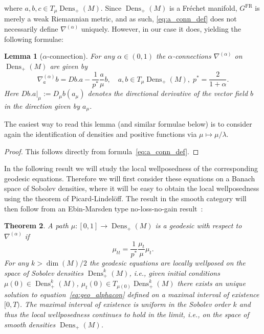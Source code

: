 \documentclass[11pt]{amsart}
\newtheorem{theorem}{Theorem}[section]
\newtheorem{lemma}[theorem]{Lemma}
\theoremstyle{definition}
\newcommand{\dx}{\lambda}
\newcommand{\Prob}{\operatorname{Prob}(M)}
\newcommand{\Dens}{\operatorname{Dens}_+(M)}
\newcommand{\Densk}{\operatorname{Dens}^k_+(M)}
\newcommand{\GFR}{G^{\mathrm{FR}}}
\newcommand{\nablabar}{\overline{\nabla}}
\begin{document}
where $a,b,c\in T_\mu\Dens$.
Since $\Dens$ is a Fr\'echet manifold, $\GFR$ is merely a weak Riemannian metric, and as such, \eqref{eq:a_conn_def} does not necessarily define $\nabla^{(\alpha)}$ uniquely.
However, in our case it does, yielding the following formulae:
\begin{lemma}[$\alpha$-connection]\label{lem:alphacon}
    For any $\alpha\in (0,1)$ the $\alpha$-connections $\nabla^{(\alpha)}$ on $\Dens$ are given by
    \begin{equation}\label{alpha-dens}
    \nabla^{(\alpha)}_a b = Db.a - \frac{1}{p^*} \frac{a}{\mu}b,\quad a,b\in T_\mu\Dens,\;p^* = \frac{2}{1+\alpha}.
    \end{equation}
    Here $Db.a|_{\mu}:=D_\mu b(a_\mu)$ denotes the directional derivative of the vector field $b$ in the direction given by $a_\mu$. 
\end{lemma}
The easiest way to read this lemma (and similar formulae below) is to consider again the identification of densities and positive functions via $\mu\mapsto \mu/\dx$.
\begin{proof}
This follows directly from formula~\eqref{eq:a_conn_def}.
\end{proof}
In the following result we will study the local wellposedness of the corresponding geodesic equations. Therefore we will first consider these equations on a Banach space of Sobolev densities, where it will be easy to obtain the local wellposedness using the theorem of Picard-Lindel\"off. The result in the smooth category will then follow from an Ebin-Marsden type no-loss-no-gain result~\cite{ebin1970groups}:
\begin{theorem}\label{thm:geo_alpha_dens}
A path $\mu:[0,1]\to \Dens$ is a geodesic with respect to $\nabla^{(\alpha)}$ if
\begin{equation}\label{eq:geo_alphacon}
\mu_{tt} = \frac{1}{p^*}\frac{\mu_t}{\mu}\mu_t.
\end{equation}
For any $k>\operatorname{dim}(M)/2$ the geodesic equations are locally wellposed on the space of Sobolev densities $\Densk$, i.e., given initial conditions $\mu(0)\in \Densk$, $\mu_t(0)\in T_{\mu(0)}\Densk$ there exists an unique solution to equation~\eqref{eq:geo_alphacon} defined on a maximal interval of existence $[0,T)$. 
The maximal interval of existence is uniform in the Sobolev order $k$ and thus the local wellposedness continues to hold in the limit, i.e., on the space of smooth densities $\Dens$.
\end{theorem}
\end{document}
